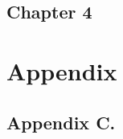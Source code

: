 \documentclass[10pt,landscape]{article}
\newenvironment{Figure}
     {\par\medskip\noindent\minipage{\linewidth}}
     {\endminipage\par\medskip}
\begin{document}
\begin{multicols}{3}
\subsection{Chapter 4}


\section{Appendix}
\subsection{Appendix C.}


%
%

\end{multicols}
\end{document}
